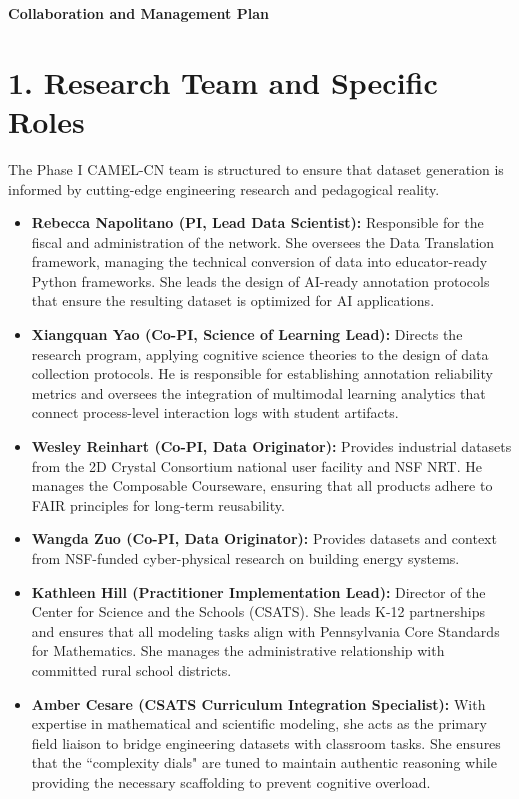 \documentclass[11pt]{article}
\begin{document}
\noindent \textbf{Collaboration and Management Plan}

\section*{1. Research Team and Specific Roles}
The Phase I CAMEL-CN team is structured to ensure that dataset generation is informed by cutting-edge engineering research and pedagogical reality.

\begin{itemize}[noitemsep, topsep=2pt]
    \item \textbf{Rebecca Napolitano (PI, Lead Data Scientist):} Responsible for the fiscal and administration of the network. She oversees the Data Translation framework, managing the technical conversion of data into educator-ready Python frameworks. She leads the design of AI-ready annotation protocols that ensure the resulting dataset is optimized for AI applications.
    \item \textbf{Xiangquan Yao (Co-PI, Science of Learning Lead):} Directs the research program, applying cognitive science theories to the design of data collection protocols. He is responsible for establishing annotation reliability metrics and oversees the integration of multimodal learning analytics that connect process-level interaction logs with student artifacts.
    \item \textbf{Wesley Reinhart (Co-PI, Data Originator):} Provides industrial datasets from the 2D Crystal Consortium national user facility and NSF NRT. He manages the Composable Courseware, ensuring that all products adhere to FAIR principles for long-term reusability.
    \item \textbf{Wangda Zuo (Co-PI, Data Originator):} Provides datasets and context from NSF-funded cyber-physical research on building energy systems. 
    \item \textbf{Kathleen Hill (Practitioner Implementation Lead):} Director of the Center for Science and the Schools (CSATS). She leads K-12 partnerships and ensures that all modeling tasks align with Pennsylvania Core Standards for Mathematics. She manages the administrative relationship with committed rural school districts.
    \item \textbf{Amber Cesare (CSATS Curriculum Integration Specialist):} With expertise in mathematical and scientific modeling, she acts as the primary field liaison to bridge engineering datasets with classroom tasks. She ensures that the ``complexity dials" are tuned to maintain authentic reasoning while providing the necessary scaffolding to prevent cognitive overload.

\end{itemize}
\end{document}

